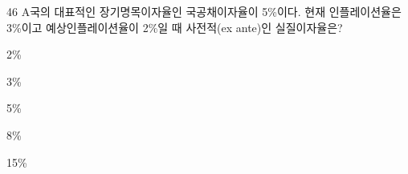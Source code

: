 \begin{question}{46}
A국의 대표적인 장기명목이자율인 국공채이자율이 5\%이다. 현재 인플레이션율은 3\%이고 예상인플레이션율이 2\%일 때 사전적(ex ante)인 실질이자율은?
\begin{choices}
  \item 2\%
  \item 3\%
  \item 5\%
  \item 8\%
  \item 15\%
\end{choices}
\end{question}
